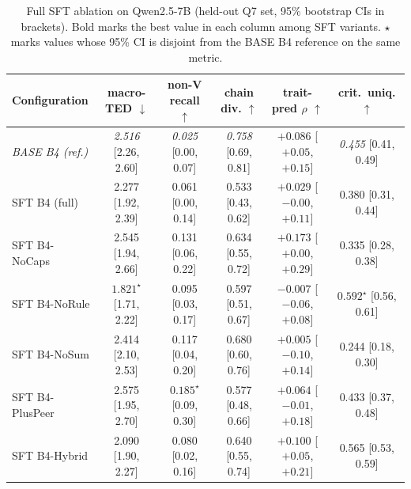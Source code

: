 \begin{table}[h]
\centering
\small
\caption{Full SFT ablation on Qwen2.5-7B (held-out Q7 set, 95\% bootstrap CIs in brackets). Bold marks the best value in each column among SFT variants. $\star$ marks values whose 95\% CI is disjoint from the BASE B4 reference on the same metric.}
\label{tab:sft_ablation_full}
\begin{tabular*}{\textwidth}{l @{\extracolsep{\fill}} ccccc}
\toprule
\textbf{Configuration} & \textbf{macro-TED} $\downarrow$ & \textbf{non-V recall} $\uparrow$ & \textbf{chain div.} $\uparrow$ & \textbf{trait-pred $\rho$} $\uparrow$ & \textbf{crit.\ uniq.} $\uparrow$ \\
\midrule
\textit{BASE B4 (ref.)} & \textit{2.516} \scriptsize{[2.26, 2.60]} & \textit{0.025} \scriptsize{[0.00, 0.07]} & \textit{0.758} \scriptsize{[0.69, 0.81]} & \textit{$+0.086$} \scriptsize{[$+0.05$, $+0.15$]} & \textit{0.455} \scriptsize{[0.41, 0.49]} \\
\midrule
SFT B4 (full)        & 2.277 \scriptsize{[1.92, 2.39]} & 0.061 \scriptsize{[0.00, 0.14]} & 0.533 \scriptsize{[0.43, 0.62]} & $+0.029$ \scriptsize{[$-0.00$, $+0.11$]} & 0.380 \scriptsize{[0.31, 0.44]} \\
SFT B4-NoCaps        & 2.545 \scriptsize{[1.94, 2.66]} & 0.131 \scriptsize{[0.06, 0.22]} & 0.634 \scriptsize{[0.55, 0.72]} & $\mathbf{+0.173}$ \scriptsize{[$+0.00$, $+0.29$]} & 0.335 \scriptsize{[0.28, 0.38]} \\
SFT B4-NoRule        & $\mathbf{1.821}^{\star}$ \scriptsize{[1.71, 2.22]} & 0.095 \scriptsize{[0.03, 0.17]} & 0.597 \scriptsize{[0.51, 0.67]} & $-0.007$ \scriptsize{[$-0.06$, $+0.08$]} & $\mathbf{0.592}^{\star}$ \scriptsize{[0.56, 0.61]} \\
SFT B4-NoSum         & 2.414 \scriptsize{[2.10, 2.53]} & 0.117 \scriptsize{[0.04, 0.20]} & $\mathbf{0.680}$ \scriptsize{[0.60, 0.76]} & $+0.005$ \scriptsize{[$-0.10$, $+0.14$]} & 0.244 \scriptsize{[0.18, 0.30]} \\
SFT B4-PlusPeer      & 2.575 \scriptsize{[1.95, 2.70]} & $\mathbf{0.185}^{\star}$ \scriptsize{[0.09, 0.30]} & 0.577 \scriptsize{[0.48, 0.66]} & $+0.064$ \scriptsize{[$-0.01$, $+0.18$]} & 0.433 \scriptsize{[0.37, 0.48]} \\
SFT B4-Hybrid        & 2.090 \scriptsize{[1.90, 2.27]} & 0.080 \scriptsize{[0.02, 0.16]} & 0.640 \scriptsize{[0.55, 0.74]} & $+0.100$ \scriptsize{[$+0.05$, $+0.21$]} & 0.565 \scriptsize{[0.53, 0.59]} \\
\bottomrule
\end{tabular*}
\end{table}

